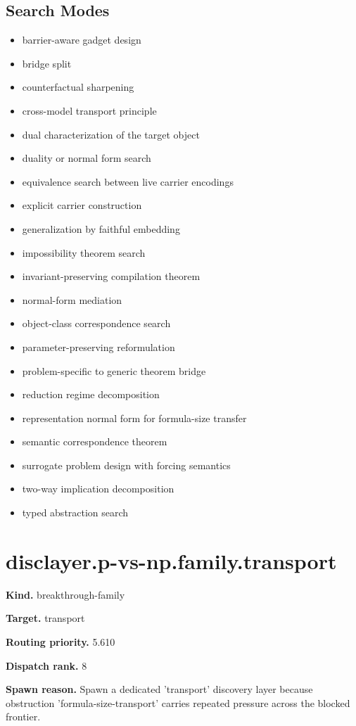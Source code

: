 \documentclass[11pt]{article}
\begin{document}
\subsection*{Search Modes}
\begin{itemize}[leftmargin=*,itemsep=0.2em]
\item barrier-aware gadget design
\item bridge split
\item counterfactual sharpening
\item cross-model transport principle
\item dual characterization of the target object
\item duality or normal form search
\item equivalence search between live carrier encodings
\item explicit carrier construction
\item generalization by faithful embedding
\item impossibility theorem search
\item invariant-preserving compilation theorem
\item normal-form mediation
\item object-class correspondence search
\item parameter-preserving reformulation
\item problem-specific to generic theorem bridge
\item reduction regime decomposition
\item representation normal form for formula-size transfer
\item semantic correspondence theorem
\item surrogate problem design with forcing semantics
\item two-way implication decomposition
\item typed abstraction search
\end{itemize}
\section{disclayer.p-vs-np.family.transport}
\textbf{Kind.} breakthrough-family

\textbf{Target.} transport

\textbf{Routing priority.} 5.610

\textbf{Dispatch rank.} 8

\textbf{Spawn reason.} Spawn a dedicated 'transport' discovery layer because obstruction 'formula-size-transport' carries repeated pressure across the blocked frontier.
\end{document}
